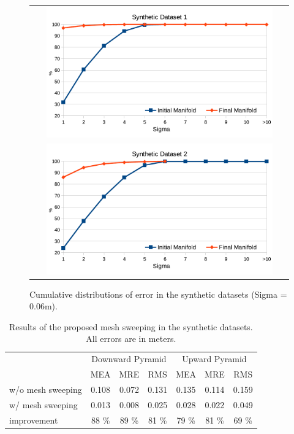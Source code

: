 \begin{figure}[t]
\setlength{\tabcolsep}{1px}
\centering
\begin{tabular}{c}
\includegraphics[width=0.9\textwidth]{./img/histSim1}\\
\includegraphics[width=0.9\textwidth]{./img/histSim2}\\
\end{tabular}
\caption{Cumulative distributions of error in the synthetic datasets (Sigma = 0.06m).}
\label{fig:simulatedhist2}
\end{figure}

\begin{table}[t]
\caption{Results of the proposed mesh sweeping in the synthetic datasets. All errors are in meters.}
\label{tab:resSim}
\normalsize
\centering
\begin{tabular}{lcccccc}
\toprule 
&\multicolumn{3}{c}{Downward Pyramid}&\multicolumn{3}{c}{Upward Pyramid}\\
              & MEA & MRE & RMS  &  MEA& MRE & RMS  \\
\midrule
w/o mesh sweeping  & 0.108 & 0.072 & 0.131 &  0.135 & 0.114 & 0.159 \\
w/ mesh sweeping    & 0.013 & 0.008 & 0.025 &  0.028 & 0.022 & 0.049 \\
improvement   & 88 \% & 89 \% & 81 \% &  79 \% & 81 \% & 69 \% \\
\end{tabular}
\end{table}



